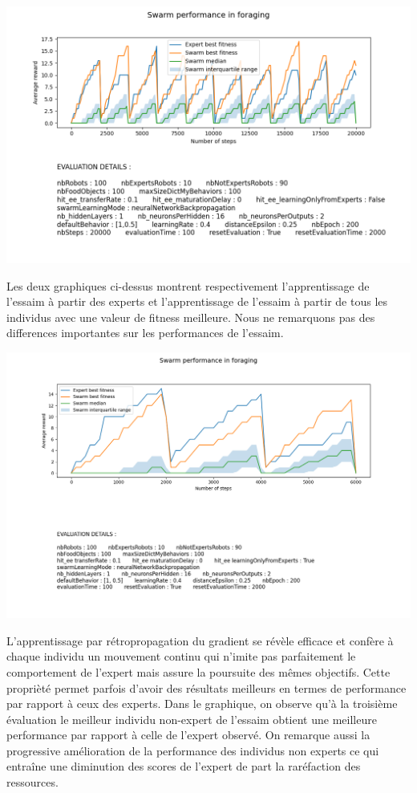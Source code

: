 \documentclass[a4paper, 12pt]{report}
\begin{document}
    \includegraphics[scale=0.5]{images/data_learnFromAll_20000_100_bp.png}
    
    Les deux graphiques ci-dessus montrent respectivement l'apprentissage de l'essaim à partir des experts et l'apprentissage de l'essaim à partir de tous les individus avec une valeur de fitness meilleure.
    Nous ne remarquons pas des differences importantes sur les performances de l'essaim.

    
    \includegraphics[scale=0.5]{bp6000_100.png}
    
    L'apprentissage par rétropropagation du gradient se révèle efficace et confère à chaque individu un mouvement continu qui n'imite pas parfaitement le comportement de l'expert mais assure la poursuite des mêmes objectifs. Cette proprièté permet parfois d'avoir des résultats meilleurs en termes de performance par rapport à ceux des experts. 
    Dans le graphique, on observe qu'à la troisième évaluation le meilleur individu non-expert de l'essaim obtient une meilleure performance par rapport à celle de l'expert observé. On remarque aussi la progressive amélioration de la performance des individus non experts ce qui entraîne une diminution des scores de l'expert de part la raréfaction des ressources.
\end{document}
